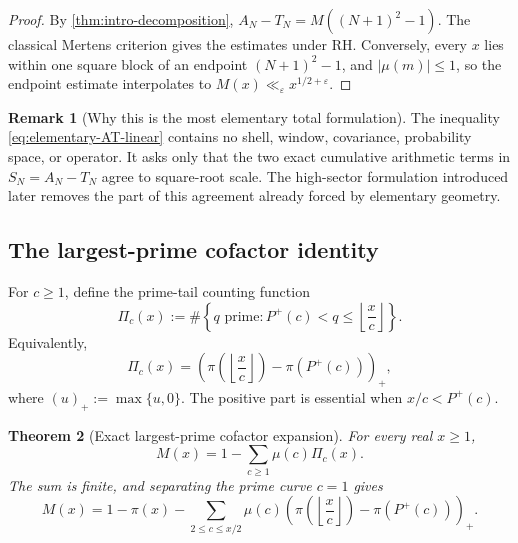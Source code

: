 \documentclass[11pt]{article}
\newtheorem{theorem}{Theorem}[section]
\theoremstyle{definition}
\newtheorem{remark}[theorem]{Remark}
\newcommand{\eps}{\varepsilon}
\newcommand{\Pplus}{P^{+}}
\newcommand{\1}{\mathbf{1}}
\begin{document}
\begin{proof}
By \cref{thm:intro-decomposition}, $A_N-T_N=M((N+1)^2-1)$.  The classical Mertens criterion gives the estimates under RH.  Conversely, every $x$ lies within one square block of an endpoint $(N+1)^2-1$, and $|\mu(m)|\le1$, so the endpoint estimate interpolates to $M(x)\ll_\eps x^{1/2+\eps}$.
\end{proof}

\begin{remark}[Why this is the most elementary total formulation]
The inequality \cref{eq:elementary-AT-linear} contains no shell, window, covariance, probability space, or operator.  It asks only that the two exact cumulative arithmetic terms in $S_N=A_N-T_N$ agree to square-root scale.  The high-sector formulation introduced later removes the part of this agreement already forced by elementary geometry.
\end{remark}

\subsection{The largest-prime cofactor identity}
\label{subsec:central-identity}

For $c\ge1$, define the prime-tail counting function
\begin{equation}
 \Pi_c(x)
 :=
 \#\left\{
 q\text{ prime}:
 \Pplus(c)<q\le\left\lfloor\frac{x}{c}\right\rfloor
 \right\}.
 \label{eq:Pi-c}
\end{equation}
Equivalently,
\begin{equation}
 \Pi_c(x)
 =
 \left(
 \pi\!\left(\left\lfloor\frac{x}{c}\right\rfloor\right)
 -\pi(\Pplus(c))
 \right)_{+},
 \label{eq:Pi-c-positive-part}
\end{equation}
where $(u)_+:=\max\{u,0\}$.  The positive part is essential when
$x/c<\Pplus(c)$.

\begin{theorem}[Exact largest-prime cofactor expansion]
\label{thm:central-M-identity}
For every real $x\ge1$,
\begin{equation}
 \boxed{
 M(x)
 =
 1-\sum_{c\ge1}\mu(c)\Pi_c(x).
 }
 \label{eq:central-M-identity-compact}
\end{equation}
The sum is finite, and separating the prime curve $c=1$ gives
\begin{equation}
 \boxed{
 M(x)
 =
 1-\pi(x)
 -\sum_{2\le c\le x/2}
 \mu(c)
 \left(
 \pi\!\left(\left\lfloor\frac{x}{c}\right\rfloor\right)
 -\pi(\Pplus(c))
 \right)_{+}.
 }
 \label{eq:central-M-identity}
\end{equation}
\end{theorem}
\end{document}
